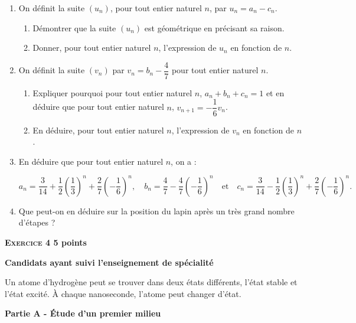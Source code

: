 \documentclass[10pt,a4paper]{article}
\begin{document}
\begin{enumerate}
\item On définit la suite $\left(u_n\right)$, pour tout entier naturel $n$, par $u_n = a_n - c_n$.
	\begin{enumerate}
		\item Démontrer que la suite $\left(u_n\right)$ est géométrique en précisant sa raison.
		\item Donner, pour tout entier naturel $n$, l'expression de $u_n$ en fonction de $n$.
	\end{enumerate}
\item  On définit la suite $\left(v_n\right)$ par $v_n = b_n - \dfrac{4}{7}$ pour tout entier naturel $n$.
	\begin{enumerate}
		\item Expliquer pourquoi pour tout entier naturel $n$,\: $a_n + b_n + c_n = 1$ et en déduire que pour tout entier naturel $n$,\: $v_{n+1} = - \dfrac{1}{6}v_n$.
		\item En déduire, pour tout entier naturel $n$, l'expression de $v_n$ en fonction de $n$.
	\end{enumerate}
\item  En déduire que pour tout entier naturel $n$, on a :

\[a_{n} = \dfrac{3}{14} +\dfrac{1}{2}\left(\dfrac{1}{3}\right)^n + \dfrac{2}{7}\left(- \dfrac{1}{6}\right)^n, \quad b_{n} = \dfrac{4}{7} - \dfrac{4}{7}\left(- \dfrac{1}{6}\right)^n \quad \text{et} \quad c_{n} = \dfrac{3}{14} -\dfrac{1}{2}\left(\dfrac{1}{3}\right)^n + \dfrac{2}{7}\left(- \dfrac{1}{6}\right)^n.\]

\item  Que peut-on en déduire sur la position du lapin après un très grand nombre d'étapes ?
\end{enumerate}
\vspace{0,5cm}

\textbf{\textsc{Exercice 4} \hfill 5 points}
 
\textbf{Candidats ayant  suivi l'enseignement de spécialité}

\medskip

Un atome d'hydrogène peut se trouver dans deux états différents, l'état stable et l'état excité. À chaque nanoseconde, l'atome peut changer d'état.

\bigskip

\textbf{Partie A - Étude d'un premier milieu}

\medskip
\end{document}
